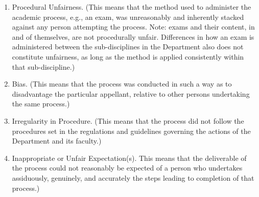 \documentclass[12pt]{article}
\begin{document}
\begin{enumerate}

    \item Procedural Unfairness.  (This means that the method used to
        administer the academic process, e.g., an exam, was unreasonably and
        inherently stacked against any person attempting the process.  Note:
        exams and their content, in and of themselves, are not procedurally
        unfair.  Differences in how an exam is administered between the
        sub-disciplines in the Department also does not constitute unfairness,
        as long as the method is applied consistently within that
        sub-discipline.)

    \item Bias. (This means that the process was conducted in such a way as to
        disadvantage the particular appellant, relative to other persons
        undertaking the same process.)

    \item Irregularity in Procedure. (This means that the process did not
        follow the procedures set in the regulations and guidelines governing
        the actions of the Department and its faculty.)

    \item Inappropriate or Unfair Expectation(s). This means that the
        deliverable of the process could not reasonably be expected of a person
        who undertakes assiduously, genuinely, and accurately the steps leading
        to completion of that process.) 

\end{enumerate}

%
%
%
\end{document}
